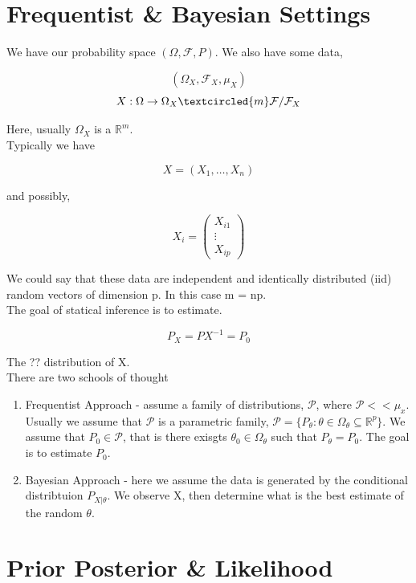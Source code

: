 \documentclass[11pt,fleqn]{book} %
\begin{document}
\section{Frequentist \& Bayesian Settings}

We have our probability space $(\Omega, \mathcal{F}, P)$. We also have some data, 

		$$(\Omega_X, \mathcal{F}_X, \mu_X)$$ 
		$$ X: \Omega \rightarrow \Omega_X \textcircled{m} \mathcal{F}/ \mathcal{F}_X$$

Here, usually $\Omega_X$ is a $\mathbb{R}^m$.\\

Typically we have 

	$$X = (X_1, \dots, X_n)$$

and possibly, 

	$$ X_i = \begin{pmatrix}
		X_{i1}\\
		\vdots\\
		X_{ip}
	\end{pmatrix}$$

We could say that these data are independent and identically distributed (iid) random vectors of dimension p. In this case m = np. \\

The goal of statical inference is to estimate.

		$$P_X = PX^{-1} = P_0$$

The ?? distribution of X. \\

There are two schools of thought

	\begin{enumerate}
		\item Frequentist Approach - assume a family of distributions, $\mathcal{P}$, where $\mathcal{P} << \mu_x$. Usually we assume that $\mathcal{P}$ is a parametric family, $\mathcal{P} = \{P_\theta: \theta \in \Omega_\theta \subseteq \mathbb{R}^p \}$. We assume that $P_0 \in \mathcal{P}$, that is there exisgts $\theta_0 \in \Omega_\theta$ such that $P_\theta = P_0$. The goal is to estimate $P_0$. 
		\item Bayesian Approach - here we assume the data is generated by the conditional distribtuion $P_{X|\theta}$. We observe X, then determine what is the best estimate of the random $\theta.$
\end{enumerate}


\section{Prior Posterior \& Likelihood}
\end{document}
